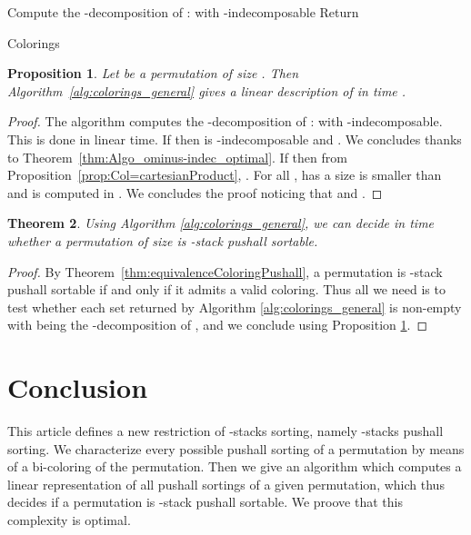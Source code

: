 \documentclass[11pt]{article}
\newtheorem{thm}{Theorem}[section]
\newtheorem{prop}[thm]{Proposition}
\newcommand{\pushall}{-stack pushall sortable\xspace}
\begin{document}
\begin{algorithm}[H]

  Compute the -decomposition of :  with  -indecomposable\;
  Return \;

  \caption{Colorings}\label{alg:colorings_general}
\end{algorithm}

\begin{prop}\label{prop:algo5}
Let  be a permutation of size .
Then Algorithm~\ref{alg:colorings_general} gives a linear description of  in time .
\end{prop}

\begin{proof} 
The algorithm computes the -decomposition of :  with  -indecomposable.
This is done in linear time.
If  then  is -indecomposable and .
We concludes thanks to Theorem~\ref{thm:Algo_ominus-indec_optimal}.
If  then from Proposition~\ref{prop:Col=cartesianProduct}, .
For all ,  has a size is smaller than  and is computed in .
We concludes the proof noticing that  and .
\end{proof}





\begin{thm}
Using Algorithm \ref{alg:colorings_general},  we can decide in time  whether a permutation  of size  is \pushall.
\end{thm}

\begin{proof}
By Theorem~\ref{thm:equivalenceColoringPushall}, a permutation  is \pushall if and only if it admits a valid coloring. 
Thus all we need is to test whether each set  returned by Algorithm \ref{alg:colorings_general} is non-empty 
with  being the -decomposition of , and we conclude	 using Proposition \ref{prop:algo5}.
\end{proof}

\section{Conclusion}\label{sec:conclusion}

This article defines a new restriction of -stacks sorting, namely -stacks pushall sorting.
We characterize every possible pushall sorting of a permutation by means of a bi-coloring of the permutation.
Then we give an  algorithm which computes a linear representation of all pushall sortings of a given permutation,
which thus decides if a permutation is \pushall.
We proove that this complexity is optimal.
\end{document}
